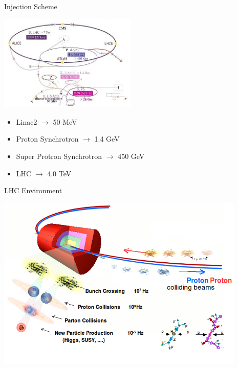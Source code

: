 \begin{frame}{Injection Scheme}
\begin{center}
\includegraphics[width=0.49\textwidth]{images/lhc_schematic.jpg}
\begin{itemize}
\item
Linac2 $\rightarrow$ 50 MeV
\item
Proton Synchrotron  $\rightarrow$ 1.4 GeV
\item
Super Protron Synchrotron  $\rightarrow$ 450 GeV
\item
LHC  $\rightarrow$ 4.0 TeV
\end{itemize}
\end{center}
\end{frame}


\begin{frame}{LHC Environment}
\begin{center}
\includegraphics[width=0.89\textwidth]{images/lhc_enviroment.png}

\end{center}
\end{frame}


